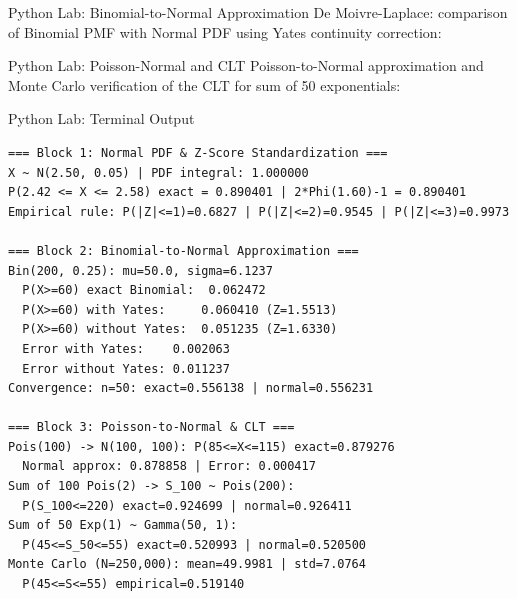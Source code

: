 \documentclass[aspectratio=169,xcolor={dvipsnames,table}]{beamer}
\begin{document}
\begin{frame}[fragile]{Python Lab: Binomial-to-Normal Approximation}
	\vspace{-0.05cm}
	\scriptsize
	De Moivre-Laplace: comparison of Binomial PMF with Normal PDF using Yates continuity correction:
	\vspace{0.02cm}
	{
	}
\end{frame}

\begin{frame}[fragile]{Python Lab: Poisson-Normal and CLT}
	\vspace{-0.05cm}
	\scriptsize
	Poisson-to-Normal approximation and Monte Carlo verification of the CLT for sum of 50 exponentials:
	\vspace{0.02cm}
	{
	}
\end{frame}

\begin{frame}[fragile]{Python Lab: Terminal Output}
	\vspace{-0.1cm}
	\begin{block}{}
		\fontsize{4pt}{5pt}\selectfont
		\begin{verbatim}
=== Block 1: Normal PDF & Z-Score Standardization ===
X ~ N(2.50, 0.05) | PDF integral: 1.000000
P(2.42 <= X <= 2.58) exact = 0.890401 | 2*Phi(1.60)-1 = 0.890401
Empirical rule: P(|Z|<=1)=0.6827 | P(|Z|<=2)=0.9545 | P(|Z|<=3)=0.9973

=== Block 2: Binomial-to-Normal Approximation ===
Bin(200, 0.25): mu=50.0, sigma=6.1237
  P(X>=60) exact Binomial:  0.062472
  P(X>=60) with Yates:     0.060410 (Z=1.5513)
  P(X>=60) without Yates:  0.051235 (Z=1.6330)
  Error with Yates:    0.002063
  Error without Yates: 0.011237
Convergence: n=50: exact=0.556138 | normal=0.556231

=== Block 3: Poisson-to-Normal & CLT ===
Pois(100) -> N(100, 100): P(85<=X<=115) exact=0.879276
  Normal approx: 0.878858 | Error: 0.000417
Sum of 100 Pois(2) -> S_100 ~ Pois(200):
  P(S_100<=220) exact=0.924699 | normal=0.926411
Sum of 50 Exp(1) ~ Gamma(50, 1):
  P(45<=S_50<=55) exact=0.520993 | normal=0.520500
Monte Carlo (N=250,000): mean=49.9981 | std=7.0764
  P(45<=S<=55) empirical=0.519140
		\end{verbatim}
	\end{block}
\end{frame}
\end{document}
